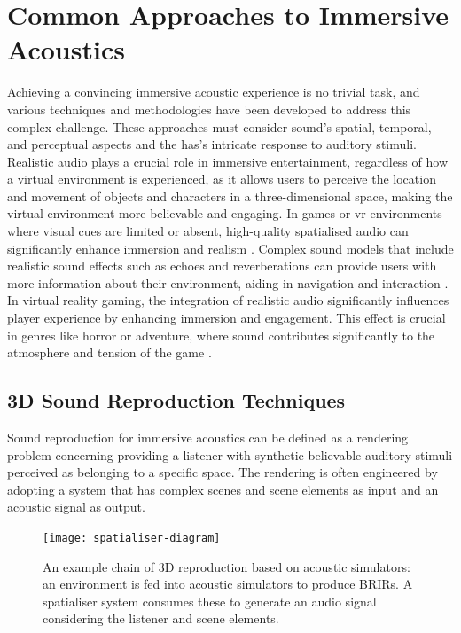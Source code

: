 \section{Common Approaches to Immersive Acoustics}
Achieving a convincing immersive acoustic experience is no trivial task, and various techniques and methodologies have been developed to address this complex challenge. These approaches must consider sound's spatial, temporal, and perceptual aspects and the \acrshort{has}'s intricate response to auditory stimuli. Realistic audio plays a crucial role in immersive entertainment, regardless of how a virtual environment is experienced, as it allows users to perceive the location and movement of objects and characters in a three-dimensional space, making the virtual environment more believable and engaging. 
In games or \acrshort{vr} environments where visual cues are limited or absent, high-quality spatialised audio can significantly enhance immersion and realism \citep{rubio2017immersive}. Complex sound models that include realistic sound effects such as echoes and reverberations can provide users with more information about their environment, aiding in navigation and interaction \citep{lokki2005navigation}. In virtual reality gaming, the integration of realistic audio significantly influences player experience by enhancing immersion and engagement. This effect is crucial in genres like horror or adventure, where sound contributes significantly to the atmosphere and tension of the game \citep{poeschl13}.

\subsection{3D Sound Reproduction Techniques}
Sound reproduction for immersive acoustics can be defined as a rendering problem concerning providing a listener with synthetic believable auditory stimuli perceived as belonging to a specific space. The rendering is often engineered by adopting a system that has complex scenes and scene elements as input and an acoustic signal as output. 
\begin{figure}
    \centering
    \texttt{[image: spatialiser-diagram]}
    \caption[Basic spatialisation chain]{An example chain of 3D reproduction based on acoustic simulators: an environment is fed into acoustic simulators to produce BRIRs. A spatialiser system consumes these to generate an audio signal considering the listener and scene elements.}
    \label{fig:spatialiser-overview}
\end{figure}

